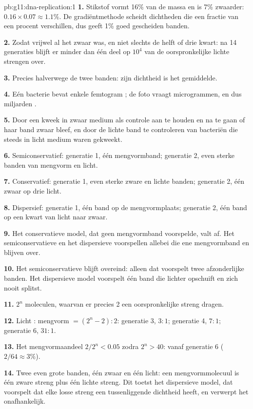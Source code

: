 \begin{solution}{pb:g11:dna-replication:1}
\textbf{1.} Stikstof vormt 16\% van de massa en is 7\% zwaarder:
$0.16 \times 0.07 \approx 1.1\%$. De gradiëntmethode scheidt dichtheden
die een fractie van een procent verschillen, dus geeft 1\% goed
gescheiden banden.

\textbf{2.} Zodat vrijwel al het  zwaar was, en niet slechts de helft
of drie kwart: na 14 generaties blijft er minder dan één deel op $10^4$
van de oorspronkelijke lichte strengen over.

\textbf{3.} Precies halverwege de twee banden: zijn dichtheid is het
gemiddelde.

\textbf{4.} Eén bacterie bevat enkele femtogram ; de foto vraagt
microgrammen, en dus miljarden .

\textbf{5.} Door een kweek in zwaar medium als controle aan te houden en
na te gaan of haar band zwaar bleef, en door de lichte band te
controleren van bacteriën die steeds in licht medium waren gekweekt.

\textbf{6.} Semiconservatief: generatie 1, één mengvormband; generatie 2,
even sterke banden van mengvorm en licht.

\textbf{7.} Conservatief: generatie 1, even sterke zware en lichte
banden; generatie 2, één zwaar op drie licht.

\textbf{8.} Dispersief: generatie 1, één band op de mengvormplaats;
generatie 2, één band op een kwart van licht naar zwaar.

\textbf{9.} Het conservatieve model, dat geen mengvormband voorspelde,
valt af. Het semiconservatieve en het dispersieve voorspellen allebei die
ene mengvormband en blijven over.

\textbf{10.} Het semiconservatieve blijft overeind: alleen dat voorspelt
twee afzonderlijke banden. Het dispersieve model voorspelt één band die
lichter opschuift en zich nooit splitst.

\textbf{11.} $2^n$ moleculen, waarvan er precies 2 een oorspronkelijke
streng dragen.

\textbf{12.} Licht : mengvorm $= (2^n - 2) : 2$: generatie 3, $3:1$;
generatie 4, $7:1$; generatie 6, $31:1$.

\textbf{13.} Het mengvormaandeel $2/2^n < 0.05$ zodra $2^n > 40$: vanaf
generatie 6 ($2/64 \approx 3\%$).

\textbf{14.} Twee even grote banden, één zwaar en één licht: een
mengvormmolecuul is één zware streng plus één lichte streng. Dit toetst
het dispersieve model, dat voorspelt dat elke losse streng een
tussenliggende dichtheid heeft, en verwerpt het onafhankelijk.


\end{solution}
